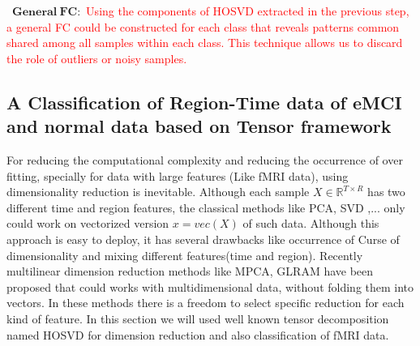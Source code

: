\documentclass[preprint,12pt]{elsarticle}
\begin{document}
\textbullet\ $\mathbf{General~FC:}$
\textcolor{red}{
	Using the components of HOSVD extracted in the previous step, a general FC could be constructed for each class that reveals patterns common shared among all samples within each class. This technique allows us to discard the role of outliers or noisy samples.  
}
\subsection{ A Classification of Region-Time data of eMCI and normal data based on  Tensor framework}
For reducing the computational complexity and reducing the  occurrence of over fitting, specially for data with large features (Like fMRI data), using  dimensionality reduction is inevitable. Although each sample $X\in \mathbb{R}^{T\times R}$ has two different time and region features, the classical methods like PCA, SVD ,... only could work on vectorized version $x=vec(X)$ of such data.
Although this approach is easy to deploy, it has several drawbacks like occurrence of Curse of dimensionality and mixing different features(time and region).
Recently multilinear dimension reduction methods like MPCA, GLRAM  have been proposed that
could works with multidimensional data, without folding them into vectors.
In these methods there is a freedom to select specific reduction for each kind of feature. In this section we will used well known tensor decomposition named HOSVD for dimension reduction and also classification of fMRI data.
\end{document}
